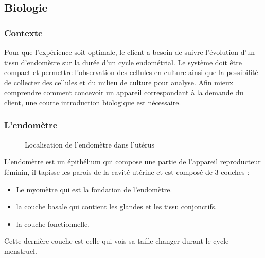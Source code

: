 \documentclass[a4paper, 11pt]{article}
\begin{document}
\subsection{Biologie}
\subsubsection{Contexte}
Pour que l'expérience soit optimale, le client a besoin de suivre l'évolution d'un tissu d'endomètre sur la 
durée d'un cycle endométrial.
Le système doit être compact et permettre l'observation des cellules en culture ainsi que la possibilité de 
collecter des cellules et du milieu de culture pour analyse.
Afin mieux comprendre comment concevoir un appareil correspondant à la demande du client, une courte 
introduction biologique est nécessaire.
\subsubsection{L'endomètre}
\begin{figure}[H]
    \centering
    \caption{Localisation de l'endomètre dans l'utérus}
    \label{fig:Schema_endomètre}
\end{figure}
L'endomètre est un épithélium qui compose une partie de l'appareil reproducteur féminin, il tapisse les 
parois de la cavité utérine et est composé de 3 couches :
\begin{itemize}
    \item Le myomètre qui est la fondation de l'endomètre.
    \item la couche basale qui contient les glandes et les tissu conjonctifs.
    \item la couche fonctionnelle.
\end{itemize}
Cette dernière couche est celle qui vois sa taille changer durant le cycle menstruel.
\end{document}
